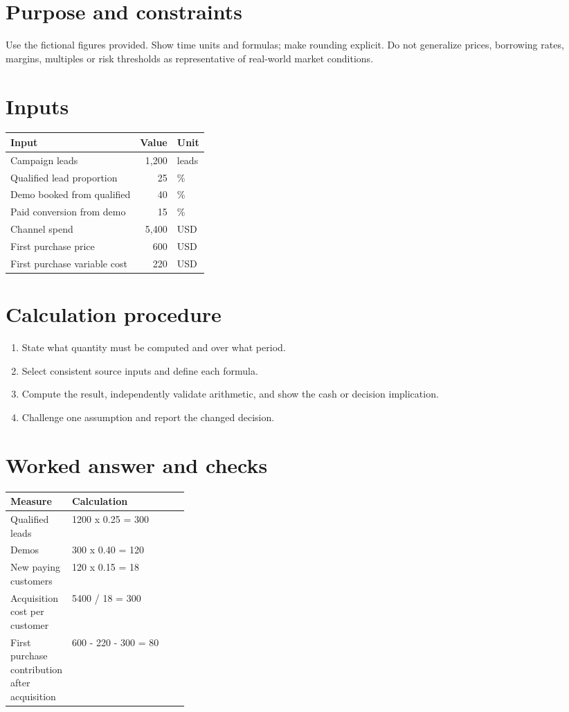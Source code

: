 \documentclass[11pt]{article}
\begin{document}
\SuiteOpen
\section{Purpose and constraints}
Use the fictional figures provided. Show time units and formulas; make rounding explicit. Do not generalize prices, borrowing rates, margins, multiples or risk thresholds as representative of real-world market conditions.
\section{Inputs}
\begin{tabularx}{\linewidth}{@{}Y r l@{}}\toprule Input & Value & Unit\\\midrule
Campaign leads & 1,200 & leads\\
Qualified lead proportion & 25 & \%\\
Demo booked from qualified & 40 & \%\\
Paid conversion from demo & 15 & \%\\
Channel spend & 5,400 & USD\\
First purchase price & 600 & USD\\
First purchase variable cost & 220 & USD\\
\bottomrule\end{tabularx}
\section{Calculation procedure}
\begin{enumerate}[leftmargin=*,itemsep=5pt]
\item State what quantity must be computed and over what period.
\item Select consistent source inputs and define each formula.
\item Compute the result, independently validate arithmetic, and show the cash or decision implication.
\item Challenge one assumption and report the changed decision.
\end{enumerate}

\section{Worked answer and checks}
\begin{tabularx}{\linewidth}{@{}p{0.30\linewidth}Y@{}}\toprule Measure & Calculation\\\midrule
Qualified leads & 1200 x 0.25 = 300\\
Demos & 300 x 0.40 = 120\\
New paying customers & 120 x 0.15 = 18\\
Acquisition cost per customer & 5400 / 18 = 300\\
First purchase contribution after acquisition & 600 - 220 - 300 = 80\\
\bottomrule\end{tabularx}
\end{document}
